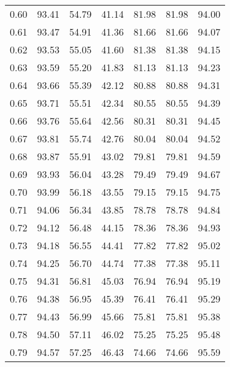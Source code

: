 \begin{tabular}{|c|c|c|c|c|c|c|}
      0.60 &     93.41 &     54.79 &      41.14 &   81.98 &      81.98 &         94.00 \\
      0.61 &     93.47 &     54.91 &      41.36 &   81.66 &      81.66 &         94.07 \\
      0.62 &     93.53 &     55.05 &      41.60 &   81.38 &      81.38 &         94.15 \\
      0.63 &     93.59 &     55.20 &      41.83 &   81.13 &      81.13 &         94.23 \\
      0.64 &     93.66 &     55.39 &      42.12 &   80.88 &      80.88 &         94.31 \\
      0.65 &     93.71 &     55.51 &      42.34 &   80.55 &      80.55 &         94.39 \\
      0.66 &     93.76 &     55.64 &      42.56 &   80.31 &      80.31 &         94.45 \\
      0.67 &     93.81 &     55.74 &      42.76 &   80.04 &      80.04 &         94.52 \\
      0.68 &     93.87 &     55.91 &      43.02 &   79.81 &      79.81 &         94.59 \\
      0.69 &     93.93 &     56.04 &      43.28 &   79.49 &      79.49 &         94.67 \\
      0.70 &     93.99 &     56.18 &      43.55 &   79.15 &      79.15 &         94.75 \\
      0.71 &     94.06 &     56.34 &      43.85 &   78.78 &      78.78 &         94.84 \\
      0.72 &     94.12 &     56.48 &      44.15 &   78.36 &      78.36 &         94.93 \\
      0.73 &     94.18 &     56.55 &      44.41 &   77.82 &      77.82 &         95.02 \\
      0.74 &     94.25 &     56.70 &      44.74 &   77.38 &      77.38 &         95.11 \\
      0.75 &     94.31 &     56.81 &      45.03 &   76.94 &      76.94 &         95.19 \\
      0.76 &     94.38 &     56.95 &      45.39 &   76.41 &      76.41 &         95.29 \\
      0.77 &     94.43 &     56.99 &      45.66 &   75.81 &      75.81 &         95.38 \\
      0.78 &     94.50 &     57.11 &      46.02 &   75.25 &      75.25 &         95.48 \\
      0.79 &     94.57 &     57.25 &      46.43 &   74.66 &      74.66 &         95.59 \\

\end{tabular}
